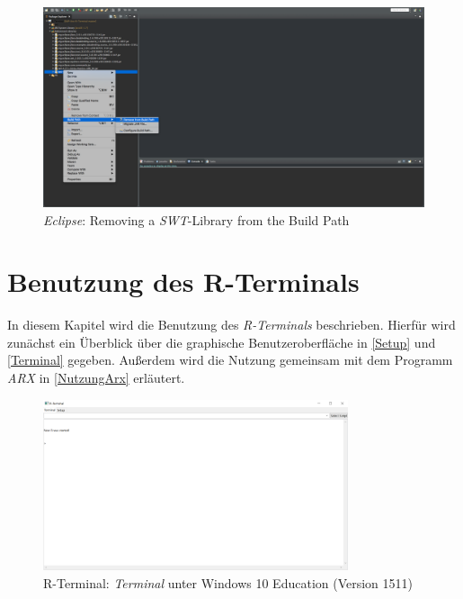 \documentclass[a4paper, 12pt]{report} %
\begin{document}
\begin{figure}[t]
	\centering
		\includegraphics[width=\linewidth]{Bilder/SWT-Remove-from-Build-Path}
    	\caption{\textit{Eclipse}: Removing a \textit{SWT}-Library from the Build Path}
    	\label{removeFromBuildPath}
\end{figure}

 
\section{Benutzung des R-Terminals}

In diesem Kapitel wird die Benutzung des \textit{R-Terminals} beschrieben. Hierfür wird zunächst ein Überblick über die graphische Benutzeroberfläche in \ref{Setup} und \ref{Terminal} gegeben. Außerdem wird die Nutzung gemeinsam mit dem Programm \textit{ARX} in \ref{NutzungArx} erläutert.\\

\begin{figure}[htpb]
\centering
\includegraphics[width=0.8\textwidth]{Bilder/rterminalwindows}
\caption{R-Terminal: \textit{Terminal} unter Windows 10 Education (Version 1511)}
\label{rterminalwindows}
\end{figure}
\end{document}
